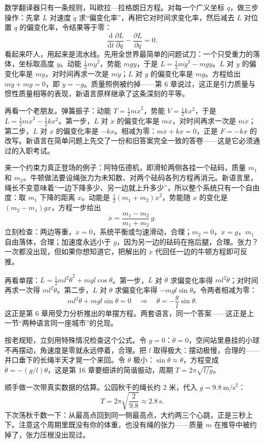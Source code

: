 \begin{mainline}
数学翻译器只有一条规则，叫欧拉—拉格朗日方程。对每一个广义坐标 \(q\)，做三步操作：先拿 \(L\) 对速度 \(\dot{q}\) 求“偏变化率”，再把它对时间求变化率，然后减去 \(L\) 对位置 \(q\) 的偏变化率，令结果等于零：
\[
\frac{\mathrm{d}}{\mathrm{d}t}\frac{\partial L}{\partial \dot{q}}-\frac{\partial L}{\partial q}=0 .
\]
看起来吓人，用起来是流水线。先用全世界最简单的问题试刀：一个只受重力的落体，坐标取高度 \(y\)。动能 \(\frac{1}{2}m\dot{y}^2\)，势能 \(mgy\)，于是 \(L=\frac{1}{2}m\dot{y}^2-mgy\)。\(L\) 对 \(\dot{y}\) 的偏变化率是 \(m\dot{y}\)，对时间再求一次是 \(m\ddot{y}\)；\(L\) 对 \(y\) 的偏变化率是 \(mg\)。方程给出 \(m\ddot{y}+mg=0\)，即 \(\ddot{y}=-g\)。质量照例被约掉——第 6 章说过，这正是引力质量与惯性质量相等的表现，新语言原样继承了这条深刻的平等。

再看一个老朋友。弹簧振子：动能 \(T=\frac{1}{2}m\dot{x}^2\)，势能 \(V=\frac{1}{2}kx^2\)，于是 \(L=\frac{1}{2}m\dot{x}^2-\frac{1}{2}kx^2\)。第一步，\(L\) 对 \(\dot{x}\) 的偏变化率是 \(m\dot{x}\)，对时间再求一次是 \(m\ddot{x}\)；第二步，\(L\) 对 \(x\) 的偏变化率是 \(-kx\)。相减为零：\(m\ddot{x}+kx=0\)，正是 \(F=-kx\) 的改写。新语言在简单问题上先交了一份和旧答案完全一致的答卷——这是它必须通过的入职考试。

来一个约束力真正登场的例子：阿特伍德机，即滑轮两侧各挂一个砝码，质量 \(m_1\) 和 \(m_2\)。牛顿做法要设绳张力为未知数、对两个砝码各列方程再消元。新语言里，绳长不变意味着“一边下降多少、另一边就上升多少”，所以整个系统只有一个自由度：取 \(m_1\) 下降的距离 \(x\)。动能是 \(\frac{1}{2}(m_1+m_2)\dot{x}^2\)，势能随 \(x\) 的变化是 \((m_2-m_1)gx\)，方程一步给出
\[
\ddot{x}=\frac{m_1-m_2}{m_1+m_2}\,g .
\]
立刻检查：两边等重，\(\ddot{x}=0\)，系统平衡或匀速滑动，合理；\(m_2=0\)，\(\ddot{x}=g\)，\(m_1\) 自由落体，合理；加速度永远小于 \(g\)，因为另一边的砝码在拖后腿，合理。张力？一次都没出现，但如果你想知道它，把解出的 \(\ddot{x}\) 代回任一边的牛顿方程即可反推。

再看单摆：\(L=\frac{1}{2}ml^2\dot{\theta}^2+mgl\cos\theta\)。第一步，\(L\) 对 \(\dot{\theta}\) 求偏变化率得 \(ml^2\dot{\theta}\)；对时间再求一次得 \(ml^2\ddot{\theta}\)。第二步，\(L\) 对 \(\theta\) 求偏变化率得 \(-mgl\sin\theta\)。令两者相减为零：
\[
ml^2\ddot{\theta}+mgl\sin\theta=0
\quad\Longrightarrow\quad
\ddot{\theta}=-\frac{g}{l}\sin\theta .
\]
这正是第 6 章用受力分析推出的单摆方程。两套语言，同一个答案——这正是上一节“两种语言同一座城市”的兑现。

按老规矩，立刻用特殊情况检查这个公式。令 \(g=0\)：\(\ddot{\theta}=0\)，空间站里悬挂的小球不再摆动，角速度是零就永远停着，合理。把 \(l\) 取得极大：摆动极慢，合理的——井口垂下的长绳半天才晃一个来回。令 \(\theta\) 极小：\(\sin\theta\approx\theta\)，方程变成 \(\ddot{\theta}=-(g/l)\theta\)，这是第 16 章要细讲的简谐振动，周期 \(T=2\pi\sqrt{l/g}\)。

顺手做一次带真实数据的估算。公园秋千的绳长约 \(2\) 米，代入 \(g=9.8\ \mathrm{m/s^2}\)：
\[
T=2\pi\sqrt{\frac{2}{9.8}}\approx 2.8\ \mathrm{s}.
\]
下次荡秋千数一下：从最高点回到同一侧最高点，大约两三个心跳，正是三秒上下。注意这个周期里既没有你的体重，也没有绳的张力——质量 \(m\) 在推导中被约掉了，张力压根没出现过。
\end{mainline}

